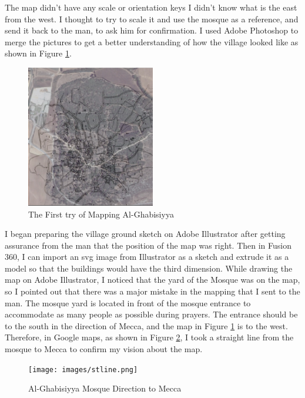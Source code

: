 The map didn't have any scale or orientation keys I didn't know what is the east from the west. I thought to try to scale it and use the mosque as a reference, and send it back to the man, to ask him for confirmation. I used Adobe Photoshop to merge the pictures to get a better understanding of how the village looked like as shown in Figure \ref{fig:wmap}.     

\begin{figure}[ht]
    \centering
    \includegraphics[width=0.50\textwidth]{images/wr_ghb.jpeg}
    \caption{The First try of Mapping Al-Ghabisiyya}
    \label{fig:wmap}
\end{figure} 

I began preparing the village ground sketch on Adobe Illustrator after getting assurance from the man that the position of the map was right. Then in Fusion 360, I can import an \acrfull{svg} image from Illustrator as a sketch and extrude it as a model so that the buildings would have the third dimension. While drawing the map on Adobe Illustrator, I noticed that the yard of the Mosque was on the map, so I pointed out that there was a major mistake in the mapping that I sent to the man.
The mosque yard is located in front of the mosque entrance to accommodate as many people as possible during prayers. The entrance should be to the south in the direction of Mecca, and the map in Figure \ref{fig:wmap} is to the west. Therefore, in Google maps, as shown in Figure \ref{fig:stline}, I took a straight line from the mosque to Mecca to confirm my vision about the map.


\begin{figure}[ht]
    \centering
    \texttt{[image: images/stline.png]}
    \caption{Al-Ghabisiyya Mosque Direction to Mecca}
    \label{fig:stline}
\end{figure} 

